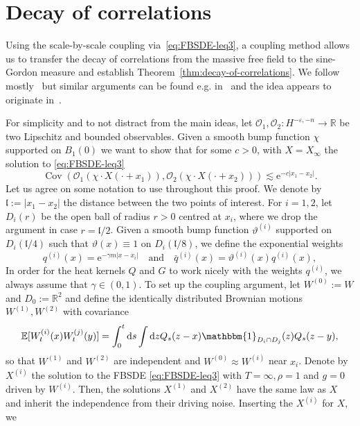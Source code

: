 \documentclass[11pt, a4paper]{scrartcl}
\numberwithin{equation}{section}
\theoremstyle{plain}
\theoremstyle{remark}
\newcommand{\assign}{:=}
\newcommand{\mathd}{\mathrm{d}}
\newcommand{\mathe}{\mathrm{e}}
\newcommand{\tmop}[1]{\ensuremath{\operatorname{#1}}}
\begin{document}
\section{Decay of correlations}\label{sec:correlations}
Using the scale-by-scale coupling via~\eqref{eq:FBSDE-leq3}, a coupling method
allows us to transfer the decay of correlations from the massive free field to
the sine-Gordon measure and establish Theorem~\ref{thm:decay-of-correlations}.
We follow mostly~{\cite{gubinelliDecayCorrelationsStochastic2025}} but similar
arguments can be found e.g.
in~{\cite{vecchiStochasticAnalysisSubcritical2025}} and the idea appears to
originate in~{\cite{funakiReversibleMeasuresMultidimensional1991}}.

For simplicity and to not distract from the main ideas, let $\mathcal{O}_1,
	\mathcal{O}_2 : H^{- \varepsilon, - n} \rightarrow \mathbb{R}$ be two
Lipschitz and bounded observables. Given a smooth bump function $\chi$
supported on $B_1 (0)$ we want to show that for some $c>0$, with $X=X_\infty$
the solution to \eqref{eq:FBSDE-leq3}
\[ \tmop{Cov} (\mathcal{O}_1 (\chi \cdot X (\cdot + x_1)),
	\mathcal{O}_2 (\chi \cdot X(\cdot + x_2))) \lesssim \mathe^{- c | x_1 - x_2 |} .
\]
Let us agree on some notation to use throughout this proof. We denote by
$\mathfrak{l} \assign | x_1 - x_2 |$ the distance between the two points of
interest. For $i = 1, 2$, let $D_i (r)$ be the open ball of radius $r > 0$
centred at $x_i$, where we drop the argument in case $r =\mathfrak{l}/ 2$.
Given a smooth bump function $\vartheta^{(i)}$ supported on $D_i (\mathfrak{l}/ 4)$
such that $\vartheta (x) \equiv 1$ on $D_i (\mathfrak{l}/ 8)$, we define the
exponential weights
\[ q^{(i)} (x) = \mathe^{- \gamma m | x - x_i |}  \quad \text{and} \quad
	\bar{q}^{(i)} (x) = \vartheta^{(i)} (x) q^{(i)} (x), \]
In order for the heat kernels $Q$ and $G$ to work nicely with the weights
$q^{(i)}$, we always assume that $\gamma \in (0, 1)$. To set up the coupling
argument, let $W^{(0)} \assign W$ and $D_0 \assign \mathbb{R}^2$ and define
the identically distributed Brownian motions $W^{(1)}, W^{(2)}$ with
covariance
\[ \mathbb{E} [W_t^{(i)} (x) W_t^{(j)} (y)] = \int_0^t \mathd s \int \mathd z
	Q_s (z - x) \mathbbm{1}_{D_i \cap D_j} (z) Q_s (z - y), \]
so that $W^{(1)}$ and $W^{(2)}$ are independent and $W^{(0)} \approx W^{(i)}$
near $x_i$. Denote by $X^{(i)}$ the solution to the FBSDE
\eqref{eq:FBSDE-leq3} with $T = \infty, \rho = 1$ and $g = 0$ driven by
$W^{(i)}$. Then, the solutions $X^{(1)}$ and $X^{(2)}$ have the same law as $X$
and inherit the
independence from their driving noise. Inserting the $X^{(i)}$ for $X$, we
\end{document}
